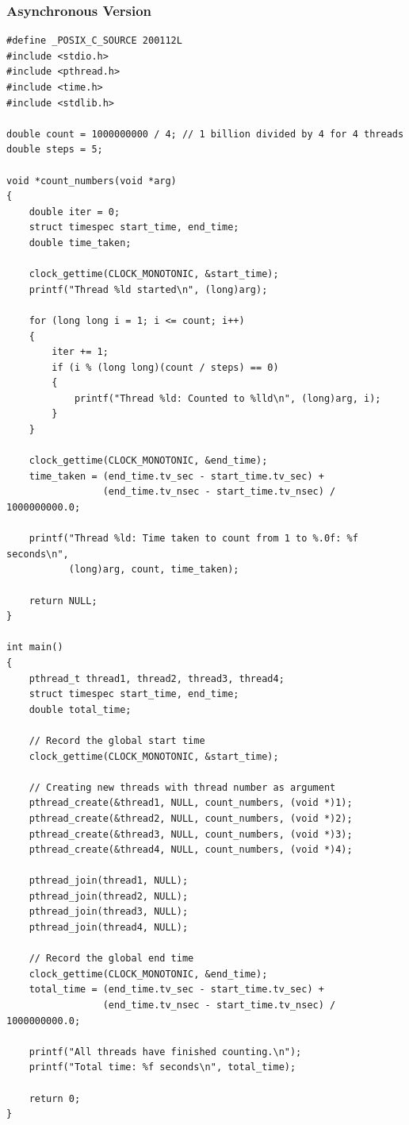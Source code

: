 \documentclass[12pt,a4paper]{article}
\begin{document}
\subsubsection{Asynchronous Version}
\begin{verbatim}
#define _POSIX_C_SOURCE 200112L
#include <stdio.h>
#include <pthread.h>
#include <time.h>
#include <stdlib.h>

double count = 1000000000 / 4; // 1 billion divided by 4 for 4 threads
double steps = 5;

void *count_numbers(void *arg)
{
    double iter = 0;
    struct timespec start_time, end_time;
    double time_taken;

    clock_gettime(CLOCK_MONOTONIC, &start_time);
    printf("Thread %ld started\n", (long)arg);

    for (long long i = 1; i <= count; i++)
    {
        iter += 1;
        if (i % (long long)(count / steps) == 0)
        {
            printf("Thread %ld: Counted to %lld\n", (long)arg, i);
        }
    }

    clock_gettime(CLOCK_MONOTONIC, &end_time);
    time_taken = (end_time.tv_sec - start_time.tv_sec) +
                 (end_time.tv_nsec - start_time.tv_nsec) / 1000000000.0;

    printf("Thread %ld: Time taken to count from 1 to %.0f: %f seconds\n",
           (long)arg, count, time_taken);

    return NULL;
}

int main()
{
    pthread_t thread1, thread2, thread3, thread4;
    struct timespec start_time, end_time;
    double total_time;

    // Record the global start time
    clock_gettime(CLOCK_MONOTONIC, &start_time);

    // Creating new threads with thread number as argument
    pthread_create(&thread1, NULL, count_numbers, (void *)1);
    pthread_create(&thread2, NULL, count_numbers, (void *)2);
    pthread_create(&thread3, NULL, count_numbers, (void *)3);
    pthread_create(&thread4, NULL, count_numbers, (void *)4);

    pthread_join(thread1, NULL);
    pthread_join(thread2, NULL);
    pthread_join(thread3, NULL);
    pthread_join(thread4, NULL);

    // Record the global end time
    clock_gettime(CLOCK_MONOTONIC, &end_time);
    total_time = (end_time.tv_sec - start_time.tv_sec) +
                 (end_time.tv_nsec - start_time.tv_nsec) / 1000000000.0;

    printf("All threads have finished counting.\n");
    printf("Total time: %f seconds\n", total_time);

    return 0;
}
\end{verbatim}
\end{document}
